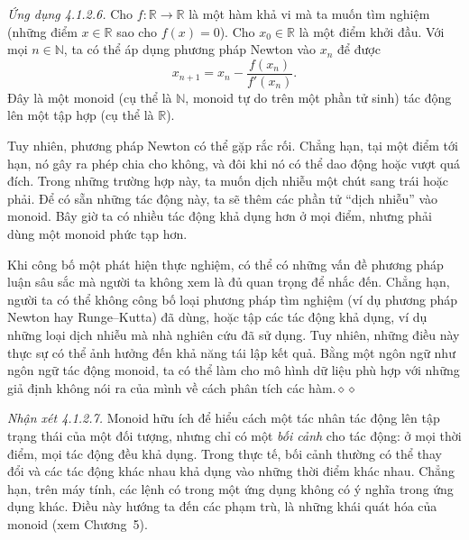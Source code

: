\noindent\textit{Ứng dụng 4.1.2.6.} Cho $f:\mathbb{R}\to\mathbb{R}$ là một hàm khả vi mà ta muốn tìm nghiệm (những điểm $x\in\mathbb{R}$ sao cho $f(x)=0$). Cho $x_0\in\mathbb{R}$ là một điểm khởi đầu. Với mọi $n\in\mathbb{N}$, ta có thể áp dụng phương pháp Newton vào $x_n$ để được
\[
x_{n+1}=x_n-\frac{f(x_n)}{f'(x_n)}.
\]
Đây là một monoid (cụ thể là $\mathbb{N}$, monoid tự do trên một phần tử sinh) tác động lên một tập hợp (cụ thể là $\mathbb{R}$).

Tuy nhiên, phương pháp Newton có thể gặp rắc rối. Chẳng hạn, tại một điểm tới hạn, nó gây ra phép chia cho không, và đôi khi nó có thể dao động hoặc vượt quá đích. Trong những trường hợp này, ta muốn dịch nhiễu một chút sang trái hoặc phải. Để có sẵn những tác động này, ta sẽ thêm các phần tử ``dịch nhiễu'' vào monoid. Bây giờ ta có nhiều tác động khả dụng hơn ở mọi điểm, nhưng phải dùng một monoid phức tạp hơn.

Khi công bố một phát hiện thực nghiệm, có thể có những vấn đề phương pháp luận sâu sắc mà người ta không xem là đủ quan trọng để nhắc đến. Chẳng hạn, người ta có thể không công bố loại phương pháp tìm nghiệm (ví dụ phương pháp Newton hay Runge--Kutta) đã dùng, hoặc tập các tác động khả dụng, ví dụ những loại dịch nhiễu mà nhà nghiên cứu đã sử dụng. Tuy nhiên, những điều này thực sự có thể ảnh hưởng đến khả năng tái lập kết quả. Bằng một ngôn ngữ như ngôn ngữ tác động monoid, ta có thể làm cho mô hình dữ liệu phù hợp với những giả định không nói ra của mình về cách phân tích các hàm.\nobreak\hfill$\diamond\diamond$

\noindent\textit{Nhận xét 4.1.2.7.} Monoid hữu ích để hiểu cách một tác nhân tác động lên tập trạng thái của một đối tượng, nhưng chỉ có một \emph{bối cảnh} cho tác động: ở mọi thời điểm, mọi tác động đều khả dụng. Trong thực tế, bối cảnh thường có thể thay đổi và các tác động khác nhau khả dụng vào những thời điểm khác nhau. Chẳng hạn, trên máy tính, các lệnh có trong một ứng dụng không có ý nghĩa trong ứng dụng khác. Điều này hướng ta đến các phạm trù, là những khái quát hóa của monoid (xem Chương~5).

